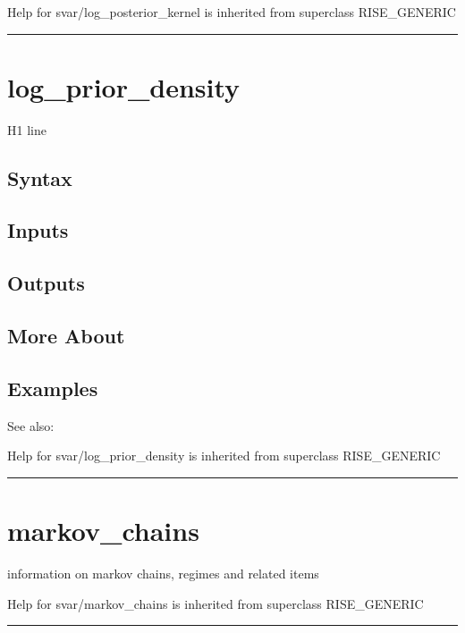 \documentclass[letterpaper,10pt,english]{sphinxmanual}
\begin{document}
Help for svar/log\_posterior\_kernel is inherited from superclass RISE\_GENERIC


\bigskip\hrule{}\bigskip



\section{log\_prior\_density}
\label{classes/models/@svar/svar:id67}\label{classes/models/@svar/svar:log-prior-density}
H1 line


\subsection{Syntax}
\label{classes/models/@svar/svar:id68}

\subsection{Inputs}
\label{classes/models/@svar/svar:id69}

\subsection{Outputs}
\label{classes/models/@svar/svar:id70}

\subsection{More About}
\label{classes/models/@svar/svar:id71}

\subsection{Examples}
\label{classes/models/@svar/svar:id72}
See also:

Help for svar/log\_prior\_density is inherited from superclass RISE\_GENERIC


\bigskip\hrule{}\bigskip



\section{markov\_chains}
\label{classes/models/@svar/svar:id73}\label{classes/models/@svar/svar:markov-chains}
information on markov chains, regimes and related items

Help for svar/markov\_chains is inherited from superclass RISE\_GENERIC


\bigskip\hrule{}\bigskip
\end{document}
